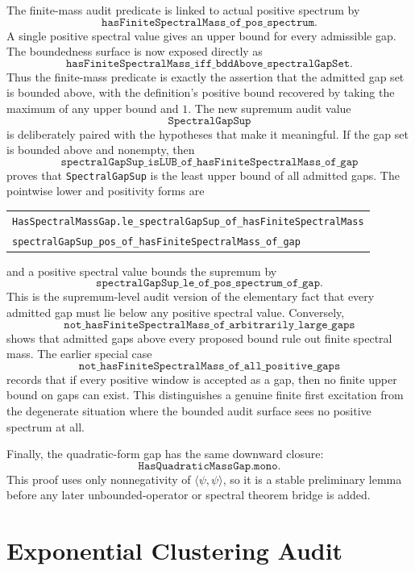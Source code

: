 \documentclass[11pt]{article}
\newcommand{\lean}[1]{\texttt{#1}}
\newcommand{\leansmall}[1]{{\small\texttt{#1}}}
\begin{document}
The finite-mass audit predicate is linked to actual positive spectrum by
\[
  \lean{hasFiniteSpectralMass\_of\_pos\_spectrum}.
\]
A single positive spectral value gives an upper bound for every admissible gap.
The boundedness surface is now exposed directly as
\[
  \lean{hasFiniteSpectralMass\_iff\_bddAbove\_spectralGapSet}.
\]
Thus the finite-mass predicate is exactly the assertion that the admitted gap
set is bounded above, with the definition's positive bound recovered by taking
the maximum of any upper bound and \(1\).  The new supremum audit value
\[
  \lean{SpectralGapSup}
\]
is deliberately paired with the hypotheses that make it meaningful.  If the
gap set is bounded above and nonempty, then
\[
  \lean{spectralGapSup\_isLUB\_of\_hasFiniteSpectralMass\_of\_gap}
\]
proves that \lean{SpectralGapSup} is the least upper bound of all admitted
gaps.  The pointwise lower and positivity forms are
\begin{center}
\begin{tabular}{l}
\leansmall{HasSpectralMassGap.le\_spectralGapSup\_of\_hasFiniteSpectralMass}\\
\leansmall{spectralGapSup\_pos\_of\_hasFiniteSpectralMass\_of\_gap}
\end{tabular}
\end{center}
and a positive spectral value bounds the supremum by
\[
  \lean{spectralGapSup\_le\_of\_pos\_spectrum\_of\_gap}.
\]
This is the supremum-level audit version of the elementary fact that every
admitted gap must lie below any positive spectral value.  Conversely,
\[
  \lean{not\_hasFiniteSpectralMass\_of\_arbitrarily\_large\_gaps}
\]
shows that admitted gaps above every proposed bound rule out finite spectral
mass.  The earlier special case
\[
  \lean{not\_hasFiniteSpectralMass\_of\_all\_positive\_gaps}
\]
records that if every positive window is accepted as a gap, then no finite
upper bound on gaps can exist.  This distinguishes a genuine finite first
excitation from the degenerate situation where the bounded audit surface sees
no positive spectrum at all.

Finally, the quadratic-form gap has the same downward closure:
\[
  \lean{HasQuadraticMassGap.mono}.
\]
This proof uses only nonnegativity of \(\langle \psi,\psi\rangle\), so it is a
stable preliminary lemma before any later unbounded-operator or spectral theorem
bridge is added.

\section{Exponential Clustering Audit}
\end{document}
